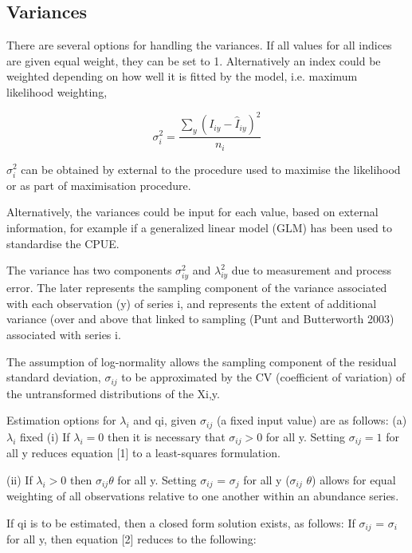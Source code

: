 \documentclass[a4paper,10pt]{article}
\begin{document}
\subsection*{Variances}

There are several options for handling the variances. If all values for all indices are given equal weight, they can be set to 1. Alternatively an index could be weighted depending on how well it is fitted by the model, i.e. maximum likelihood weighting, 

\begin{equation}\label{eq1}
\sigma_{i}^2=\frac{\sum_{y} (I_{iy}-{\hat I}_{iy})^2}{n_i}
\end{equation}

$\sigma_i^2$ can be obtained by external to the procedure used to maximise the likelihood or as part of maximisation procedure. 

Alternatively, the variances could be input for each value, based on external information, for example if a generalized linear model (GLM) has been used to standardise the CPUE.

The variance has two components $\sigma_{iy}^2$ and $\lambda_{iy}^2$ due to measurement and process error. The later represents the sampling component of the variance associated with each observation (y) of series i, and represents the extent of additional variance (over and above that linked to sampling (Punt and Butterworth 2003) associated with series i.

The assumption of log-normality allows the sampling component of the residual standard deviation, $\sigma_{ij}$ to be approximated by the CV (coefficient of variation) of the untransformed distributions of the Xi,y.


Estimation options for $\lambda_{i}$ and qi, given $\sigma_{ij}$ (a fixed input value) are as follows:
 (a)  $\lambda_{i}$ fixed
 (i) If $\lambda_{i}=0$ then it is necessary that $\sigma_{ij} > 0$ for all y. Setting $\sigma_{ij} = 1$ for all y reduces equation [1] to a least-squares formulation.
 

(ii)  If $\lambda_{i} > 0$ then $\sigma_{ij} \theta$ for all y. Setting $\sigma_{ij}$ = $\sigma_{j}$ for all y ($\sigma_{ij}$ $\theta$) allows for equal weighting of all observations relative to one another within an abundance series.

If qi is to be estimated, then a closed form solution exists, as follows:
If $\sigma_{ij}$ = $\sigma_{i}$ for all y, then equation [2] reduces to the following:
\end{document}

